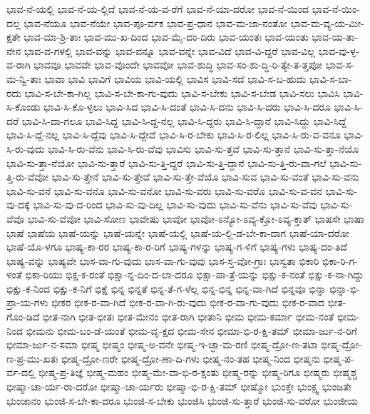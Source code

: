 {ಭಾವ-ನೆ-ಯಲ್ಲಿ
ಭಾವ-ನೆ-ಯ-ಲ್ಲಿದೆ
ಭಾವ-ನೆ-ಯ-ವ-ರೆಗೆ
ಭಾವ-ನೆ-ಯಾ-ದರೋ
ಭಾವ-ನೆ-ಯಿಂದ
ಭಾವ-ನೆ-ಯಿಂ-ದಲ್ಲ
ಭಾವ-ನೆಯೂ
ಭಾವ-ನೆಯೇ
ಭಾವ-ಪೂ-ರ್ವಕ
ಭಾವ-ಪ್ರ-ಧಾನ
ಭಾವ-ಮ-ಜಾ-ನಂತೋ
ಭಾವ-ಮ-ವ್ಯ-ಯ-ಮೀ-ಕ್ಷತೇ
ಭಾವ-ಮಾ-ಶ್ರಿ-ತಾಃ
ಭಾವ-ಮು-ಖ-ದಿಂದ
ಭಾವ-ಮೈ-ದಂ-ದಿರು
ಭಾವ-ಯಂತಃ
ಭಾವ-ಯಂತು
ಭಾವ-ಯ-ತಾ-ನೇನ
ಭಾವ-ವ-ಗಳಲ್ಲಿ
ಭಾವ-ವನ್ನು
ಭಾವ-ವನ್ನೂ
ಭಾವ-ವನ್ನೇ
ಭಾವ-ವಿದೆ
ಭಾವ-ವಿ-ದ್ದರೆ
ಭಾವ-ವಿಲ್ಲ
ಭಾವ-ವು-ಳ್ಳ-ವ-ರಾಗಿ
ಭಾವವೂ
ಭಾವವೇ
ಭಾವ-ವೊಂದೇ
ಭಾವವೋ
ಭಾವ-ಶುದ್ಧಿ
ಭಾವ-ಸಂ-ಶು-ದ್ಧಿ-ರಿ-ತ್ಯೇ-ತ-ತ್ತಪೋ
ಭಾವ-ಸ-ಮ-ನ್ವಿ-ತಾಃ
ಭಾವಾ
ಭಾವಿ
ಭಾವಿಗೆ
ಭಾವಿಯ
ಭಾವಿ-ಯಲ್ಲಿ
ಭಾವಿಸ
ಭಾವಿ-ಸದೆ
ಭಾವಿ-ಸ-ಬ-ಹುದು
ಭಾವಿ-ಸ-ಬಾ-ರದು
ಭಾವಿ-ಸ-ಬೇ-ಕಾ-ಗಿಲ್ಲ
ಭಾವಿ-ಸ-ಬೇ-ಕಾ-ಗು-ವುದು
ಭಾವಿ-ಸ-ಬೇಕು
ಭಾವಿ-ಸ-ಬೇಡ
ಭಾವಿ-ಸಲು
ಭಾವಿಸಿ
ಭಾವಿ-ಸಿ-ಕೊಂಡು
ಭಾವಿ-ಸಿ-ಕೊ-ಳ್ಳಲು
ಭಾವಿ-ಸಿದ
ಭಾವಿ-ಸಿ-ದಂತೆ
ಭಾವಿ-ಸಿ-ದನು
ಭಾವಿ-ಸಿ-ದರು
ಭಾವಿ-ಸಿ-ದರೂ
ಭಾವಿ-ಸಿ-ದರೆ
ಭಾವಿ-ಸಿ-ದಾ-ಗಲೂ
ಭಾವಿ-ಸಿದ್ದ
ಭಾವಿ-ಸಿ-ದ್ದ-ನಲ್ಲ
ಭಾವಿ-ಸಿ-ದ್ದರು
ಭಾವಿ-ಸಿ-ದ್ದಾನೆ
ಭಾವಿ-ಸಿದ್ದು
ಭಾವಿ-ಸಿದ್ದೆ
ಭಾವಿ-ಸಿ-ದ್ದೆ-ನಲ್ಲ
ಭಾವಿ-ಸಿ-ದ್ದೆವು
ಭಾವಿ-ಸಿ-ದ್ದೇವೆ
ಭಾವಿ-ಸಿ-ರ-ಬೇಕು
ಭಾವಿ-ಸಿ-ರ-ಲಿಲ್ಲ
ಭಾವಿ-ಸಿ-ರು-ವ-ವನೂ
ಭಾವಿ-ಸಿ-ರು-ವುದು
ಭಾವಿ-ಸಿ-ರು-ವೆನು
ಭಾವಿ-ಸಿ-ರು-ವೆವು
ಭಾವಿಸು
ಭಾವಿ-ಸು-ತ್ತವೆ
ಭಾವಿ-ಸು-ತ್ತಾನೆ
ಭಾವಿ-ಸು-ತ್ತಾ-ನೆಯೊ
ಭಾವಿ-ಸು-ತ್ತಾ-ನೆಯೋ
ಭಾವಿ-ಸು-ತ್ತಾರೆ
ಭಾವಿ-ಸು-ತ್ತಿ-ದ್ದರೆ
ಭಾವಿ-ಸು-ತ್ತಿ-ದ್ದಾನೆ
ಭಾವಿ-ಸು-ತ್ತಿ-ರು-ವಾ-ಗಲೆ
ಭಾವಿ-ಸು-ತ್ತಿ-ರು-ವೆವೋ
ಭಾವಿ-ಸು-ತ್ತೇನೆ
ಭಾವಿ-ಸು-ತ್ತೇವೆ
ಭಾವಿ-ಸು-ತ್ತೇ-ವೆಯೊ
ಭಾವಿ-ಸುವ
ಭಾವಿ-ಸು-ವಂತೆ
ಭಾವಿ-ಸು-ವನು
ಭಾವಿ-ಸು-ವನೆ
ಭಾವಿ-ಸು-ವನೊ
ಭಾವಿ-ಸು-ವನೋ
ಭಾವಿ-ಸು-ವರು
ಭಾವಿ-ಸು-ವರೊ
ಭಾವಿ-ಸು-ವ-ವನ
ಭಾವಿ-ಸು-ವು-ದಕ್ಕೆ
ಭಾವಿ-ಸು-ವು-ದ-ರಿಂದ
ಭಾವಿ-ಸು-ವು-ದಿಲ್ಲ
ಭಾವಿ-ಸು-ವುದು
ಭಾವಿ-ಸು-ವೆನು
ಭಾವಿ-ಸು-ವೆವು
ಭಾವಿ-ಸು-ವೆವೊ
ಭಾವಿ-ಸು-ವೆವೋ
ಭಾವಿ-ಸೋಣ
ಭಾವೇಷು
ಭಾವೋ
ಭಾವೋ-ಽನ್ಯೋ-ಽವ್ಯ-ಕ್ತೋ-ಽವ್ಯ-ಕ್ತಾತ್
ಭಾಷಸೇ
ಭಾಷಾ
ಭಾಷೆ
ಭಾಷೆಯ
ಭಾಷೆ-ಯನ್ನು
ಭಾಷೆ-ಯನ್ನೇ
ಭಾಷೆ-ಯಲ್ಲಿ
ಭಾಷೆ-ಯ-ಲ್ಲಿ-ಡ-ಬೇ-ಕಾ-ದಾಗ
ಭಾಷೆ-ಯಾ-ದರೋ
ಭಾಷೆ-ಯೊ-ಳಗೂ
ಭಾಷ್ಯ-ಕಾ-ರರ
ಭಾಷ್ಯ-ಕಾ-ರ-ರಿಗೆ
ಭಾಷ್ಯ-ಗಳನ್ನು
ಭಾಷ್ಯ-ಗ-ಳಿಗೆ
ಭಾಷ್ಯ-ಗಳು
ಭಾಷ್ಯ-ದಂ-ತಿದೆ
ಭಾಷ್ಯ-ವನ್ನು
ಭಾಷ್ಯವೇ
ಭಾಸ-ವಾ-ಗು-ವುದು
ಭಾಸ-ವಾ-ಗು-ವುವು
ಭಾಸ-ಸ್ತ-ವೋ-ಗ್ರಾಃ
ಭಾಸ್ವತಾ
ಭಿಕಾರಿ
ಭಿಕಾ-ರಿ-ಗ-ಳಂತೆ
ಭಿಕಾ-ರಿಯು
ಭಿಕ್ಷ-ಕ-ರಂತೆ
ಭಿಕ್ಷಾ-ನ್ನ-ದಿಂ-ದ-ಲಾ-ದರೂ
ಭಿಕ್ಷಾ-ಪಾ-ತ್ರೆ-ಯನ್ನು
ಭಿಕ್ಷು-ಕ-ನಂತೆ
ಭಿಕ್ಷು-ಕ-ನಾ-ಗಿದ್ದು
ಭಿಕ್ಷು-ಕ-ನಿಂದ
ಭಿಕ್ಷು-ಕ-ನಿಗೆ
ಭಿಕ್ಷೆ
ಭಿನ್ನ
ಭಿನ್ನತೆ
ಭಿನ್ನ-ತೆ-ಗ-ಳೆಲ್ಲ
ಭಿನ್ನ-ಭಿನ್ನ
ಭಿನ್ನ-ವಾ-ಗಿದೆ
ಭಿನ್ನವೂ
ಭಿನ್ನಾ
ಭಿನ್ನಾ-ಭಿ-ಪ್ರಾ-ಯ-ಗಳು
ಭೀಕರ
ಭೀಕ-ರ-ವಾ-ಗಿದೆ
ಭೀಕ-ರ-ವಾ-ಗಿ-ರು-ವುದು
ಭೀಕ-ರ-ವಾ-ಗು-ವುದು
ಭೀಕ-ರ-ವಾದ
ಭೀತ-ಗೊಂ-ಡಿದೆ
ಭೀತ-ನಾಗಿ
ಭೀತ-ಭೀತಃ
ಭೀತ-ಮೇನಂ
ಭೀತ-ರಾಗಿ
ಭೀತಾನಿ
ಭೀಮ
ಭೀಮ-ಕರ್ಮಾ
ಭೀಮ-ನಂತೆ
ಭೀಮ-ನಿಂದ
ಭೀಮನು
ಭೀಮ-ಬಂ-ಡೆ-ಯಂತೆ
ಭೀಮ-ವೃ-ಕ್ಷದ
ಭೀಮ-ಸೇನ
ಭೀಮಾ-ಭಿ-ರ-ಕ್ಷಿ-ತಮ್
ಭೀಮಾ-ರ್ಜು-ನ-ರಿಗೆ
ಭೀಮಾ-ರ್ಜು-ನ-ಸಮಾ
ಭೀಷ್ಮ
ಭೀಷ್ಮಂ
ಭೀಷ್ಮ-ಅ-ವನೇ
ಭೀಷ್ಮ-ಇ-ಚ್ಛಾ-ಮ-ರಣಿ
ಭೀಷ್ಮ-ದ್ರೋ-ಣ-ತಟಾ
ಭೀಷ್ಮ-ದ್ರೋ-ಣ-ಪ್ರ-ಮು-ಖತಃ
ಭೀಷ್ಮ-ದ್ರೋ-ಣರೇ
ಭೀಷ್ಮ-ದ್ರೋ-ಣಾ-ದಿ-ಗಳು
ಭೀಷ್ಮ-ನಂ-ತಹ
ಭೀಷ್ಮ-ನಿಂದ
ಭೀಷ್ಮನು
ಭೀಷ್ಮ-ಪ-ರ್ವ-ದಲ್ಲಿ
ಭೀಷ್ಮ-ಪ್ರ-ತಿಜ್ಞೆ
ಭೀಷ್ಮ-ಮಹಂ
ಭೀಷ್ಮ-ಮೇ-ವಾ-ಭಿ-ರ-ಕ್ಷಂತು
ಭೀಷ್ಮ-ರನ್ನು
ಭೀಷ್ಮ-ರಿಗೂ
ಭೀಷ್ಮರು
ಭೀಷ್ಮಶ್ಚ
ಭೀಷ್ಮಾ-ಚಾ-ರ್ಯ-ರಾ-ದರೋ
ಭೀಷ್ಮಾ-ಚಾ-ರ್ಯರು
ಭೀಷ್ಮಾ-ಭಿ-ರ-ಕ್ಷಿ-ತಮ್
ಭೀಷ್ಮೋ
ಭುಂಕ್ತೇ
ಭುಂಕ್ಷ್ವ
ಭುಂಜತೇ
ಭುಂಜಾನಂ
ಭುಂಜಿ-ಸ-ಬೇ-ಕಾ-ದರೂ
ಭುಂಜಿ-ಸ-ಬೇಕು
ಭುಂಜಿಸಿ
ಭುಂಜಿ-ಸು-ತ್ತಾರೆ
ಭುಂಜಿ-ಸು-ವರೋ
ಭುಂಜೀಯ
}
